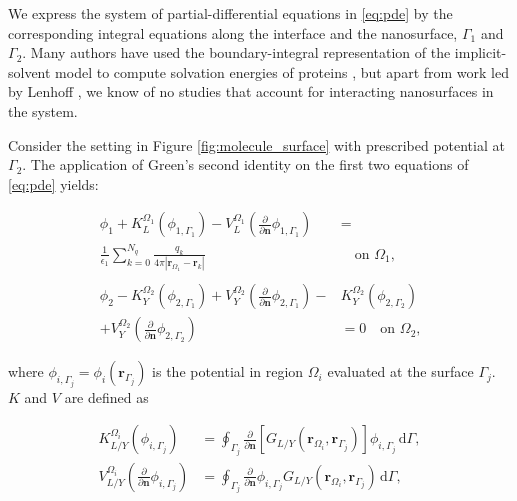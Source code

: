 


We express the system of partial-differential equations in  \eqref{eq:pde} by the corresponding integral equations along the interface and the nanosurface, $\Gamma_1$ and $\Gamma_2$. Many authors have used the boundary-integral representation of the implicit-solvent model to compute solvation energies of proteins \cite{YoonLenhoff1990, Juffer1991a, LuETal2006, BajajETal2011, AltmanBardhanWhiteTidor09, GengKrasny2013, CooperBardhanBarba2013}, but apart from work led by Lenhoff \cite{YoonLenhoff1992}, we know of no studies that account for interacting nanosurfaces in the system. 

Consider the setting in Figure \ref{fig:molecule_surface} with prescribed potential at $\Gamma_2$. The application of Green's second identity on the first two equations of \eqref{eq:pde} yields:

\begin{align} \label{eq:green_identity}
\phi_{1}+ K_{L}^{\Omega_1}(\phi_{1,\Gamma_1}) -  V_{L}^{\Omega_1} \left(\frac{\partial}{\partial \mathbf{n}}  \phi_{1,\Gamma_1}  \right) &  = \nonumber\\
 \frac{1}{\epsilon_1} \sum_{k=0}^{N_q}  \frac{q_k}{4\pi|\mathbf{r}_{\Omega_1} - \mathbf{r}_k|} &  \quad \text{on $\Omega_1$,} \nonumber \\ \nonumber \\
\phi_{2} - K_{Y}^{\Omega_2}(\phi_{2,\Gamma_1}) + V_{Y}^{\Omega_2} \left( \frac{\partial}{\partial \mathbf{n}} \phi_{2,\Gamma_1} \right) - & K_{Y}^{\Omega_2}(\phi_{2,\Gamma_2})  \nonumber \\
 + V_{Y}^{\Omega_2}  \left( \frac{\partial}{\partial \mathbf{n}} \phi_{2,\Gamma_2} \right) & = 0 \quad \text{on $\Omega_2$,}
\end{align}

\noindent where $\phi_{i,\Gamma_j} = \phi_i(\mathbf{r}_{\Gamma_j})$ is the potential in region $\Omega_i$ evaluated at the surface $\Gamma_j$. $K$ and $V$ are defined as

%
\begin{align} \label{eq:layers}
K_{L/Y}^{\Omega_i}(\phi_{i,\Gamma_j}) &= \oint_{\Gamma_j} \frac{\partial}{\partial \mathbf{n}} \left[ G_{L/Y}(\mathbf{r}_{\Omega_i},\mathbf{r}_{\Gamma_j}) \right]\phi_{i,\Gamma_j} \, \mathrm{d} \Gamma, \nonumber \\
V_{L/Y}^{\Omega_i} \left( \frac{\partial}{\partial \mathbf{n}} \phi_{i,\Gamma_j} \right) &= \oint_{\Gamma_j} \frac{\partial}{\partial \mathbf{n}} \phi_{i,\Gamma_j} G_{L/Y}(\mathbf{r}_{\Omega_i},\mathbf{r}_{\Gamma_j})  \, \mathrm{d} \Gamma,
\end{align}

